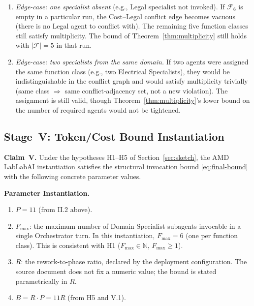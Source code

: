 \documentclass[12pt]{article}
\theoremstyle{definition}
\begin{document}
\begin{enumerate}
    \item[IV.4] \emph{Edge-case: one specialist absent} (e.g., Legal
                specialist not invoked).  If $\mathcal{F}_{6}$ is
                empty in a particular run, the Cost--Legal conflict
                edge becomes vacuous (there is no Legal agent to
                conflict with).  The remaining five function classes
                still satisfy multiplicity.  The bound of
                Theorem~\ref{thm:multiplicity} still holds with
                $|\mathcal{F}| = 5$ in that run. \checkmark

    \item[IV.5] \emph{Edge-case: two specialists from the same
                domain.}  If two agents were assigned the same
                function class (e.g., two Electrical Specialists),
                they would be indistinguishable in the conflict graph
                and would satisfy multiplicity trivially (same class
                $\Rightarrow$ same conflict-adjacency set, not a
                new violation).  The assignment is still valid, though
                Theorem~\ref{thm:multiplicity}'s lower bound on the
                number of required agents would not be tightened.
\end{enumerate}

\subsection{Stage~V: Token/Cost Bound Instantiation}
\label{sec:case-study-token}

\noindent\textbf{Claim~V.}  Under the hypotheses H1--H5 of
Section~\ref{sec:sketch}, the AMD LabLabAI instantiation satisfies
the structural invocation bound \eqref{eq:final-bound} with the
following concrete parameter values.

\medskip
\noindent\textbf{Parameter Instantiation.}
\begin{enumerate}
    \item[V.1] $P = 11$ (from II.2 above). \checkmark
    \item[V.2] $F_{\max}$: the maximum number of Domain Specialist
               subagents invocable in a single Orchestrator turn.  In
               this instantiation, $F_{\max} = 6$ (one per
               function class).  This is consistent with H1 ($F_{\max}
               \in \mathbb{N}$, $F_{\max} \geq 1$). \checkmark
    \item[V.3] $R$: the rework-to-phase ratio, declared by the
               deployment configuration.  The source document does not
               fix a numeric value; the bound is stated parametrically
               in $R$. \checkmark
    \item[V.4] $B = R \cdot P = 11R$ (from H5 and V.1). \checkmark
\end{enumerate}
\end{document}
